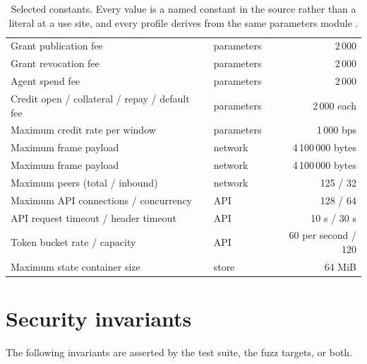 \documentclass{article}
\begin{document}
\begin{table}[t]
\begin{tabular}{llr}
Grant publication fee & parameters & 2\,000 \\
Grant revocation fee & parameters & 2\,000 \\
Agent spend fee & parameters & 2\,000 \\
Credit open / collateral / repay / default fee & parameters & 2\,000 each \\
Maximum credit rate per window & parameters & 1\,000 bps \\
Maximum frame payload & network & 4\,100\,000 bytes \\
Maximum frame payload & network & 4\,100\,000 bytes \\
Maximum peers (total / inbound) & network & 125 / 32 \\
Maximum API connections / concurrency & API & 128 / 64 \\
API request timeout / header timeout & API & 10 s / 30 s \\
Token bucket rate / capacity & API & 60 per second / 120 \\
Maximum state container size & store & 64 MiB \\
\bottomrule
\end{tabular}
\caption{Selected constants. Every value is a named constant in the source
rather than a literal at a use site, and every profile derives from the same
parameters module \cite{jounit-spec}.}
\label{tab:constants}
\end{table}

\section{Security invariants}
\label{app:invariants}

The following invariants are asserted by the test suite, the fuzz targets, or
both.
\end{document}
